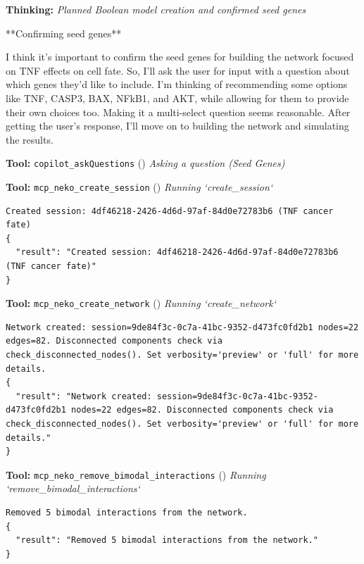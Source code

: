 \documentclass[11pt,a4paper]{article}
\begin{document}
\begin{thinkbox}
\textbf{Thinking:} \textit{Planned Boolean model creation and confirmed seed genes}

**Confirming seed genes**

I think it’s important to confirm the seed genes for building the network focused on TNF effects on cell fate. So, I’ll ask the user for input with a question about which genes they’d like to include. I’m thinking of recommending some options like TNF, CASP3, BAX, NFkB1, and AKT, while allowing for them to provide their own choices too. Making it a multi-select question seems reasonable. After getting the user’s response, I’ll move on to building the network and simulating the results.

\end{thinkbox}
\begin{toolokbox}
\textbf{Tool:} \texttt{copilot\_askQuestions} (\checkmark)
\textit{Asking a question (Seed Genes)}
\end{toolokbox}
\begin{toolokbox}
\textbf{Tool:} \texttt{mcp\_neko\_create\_session} (\checkmark)
\textit{Running `create\_session`}
\begin{lstlisting}
Created session: 4df46218-2426-4d6d-97af-84d0e72783b6 (TNF cancer fate)
{
  "result": "Created session: 4df46218-2426-4d6d-97af-84d0e72783b6 (TNF cancer fate)"
}
\end{lstlisting}
\end{toolokbox}
\begin{toolokbox}
\textbf{Tool:} \texttt{mcp\_neko\_create\_network} (\checkmark)
\textit{Running `create\_network`}
\begin{lstlisting}
Network created: session=9de84f3c-0c7a-41bc-9352-d473fc0fd2b1 nodes=22 edges=82. Disconnected components check via check_disconnected_nodes(). Set verbosity='preview' or 'full' for more details.
{
  "result": "Network created: session=9de84f3c-0c7a-41bc-9352-d473fc0fd2b1 nodes=22 edges=82. Disconnected components check via check_disconnected_nodes(). Set verbosity='preview' or 'full' for more details."
}
\end{lstlisting}
\end{toolokbox}
\begin{toolokbox}
\textbf{Tool:} \texttt{mcp\_neko\_remove\_bimodal\_interactions} (\checkmark)
\textit{Running `remove\_bimodal\_interactions`}
\begin{lstlisting}
Removed 5 bimodal interactions from the network.
{
  "result": "Removed 5 bimodal interactions from the network."
}
\end{lstlisting}
\end{toolokbox}
\end{document}

